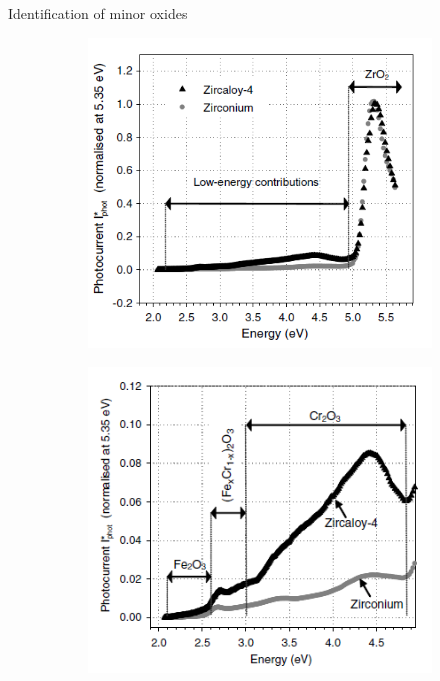 \documentclass[10pt,compress]{beamer}
\newcommand{\coef}{1}
\begin{document}
\begin{frame}[allowframebreaks=1.0]{Identification of minor oxides}
        \renewcommand{\coef}{0.45}
        \begin{figure}[h]
            \centering
            \begin{subfigure}{\coef\textwidth}
                \centering
                \includegraphics[width=\textwidth]{./src/figures/Benaboud2007-Fig4.png}
                \caption{}
                \label{fig_benaboud_minor_oxides_a}
            \end{subfigure}
            \begin{subfigure}{\coef\textwidth}
                \centering
                \includegraphics[width=\textwidth]{./src/figures/Benaboud2007-Fig5.png}
                \caption{}
                \label{fig_benaboud_minor_oxides_b}
            \end{subfigure}
            

\end{figure}
\end{frame}
\end{document}
